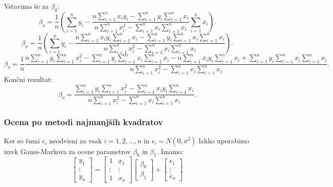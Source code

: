 \documentclass{article}
\begin{document}
Vstavimo še za $\beta_0$:
\begin{equation*}
\beta_o = \frac{1}{n} \left(\sum_{i=1}^n y_i - \frac{n\sum_{i=1}^nx_iy_i- \sum_{i=1}^n y_i \sum_{i=1}^n x_i}{n\sum_{i=1}^nx_i^2-\sum_{i=1}^nx_i\sum_{i=1}^nx_i}\sum_{i=1}^nx_i \right).
\end{equation*}
\begin{equation*}
\beta_o = \frac{1}{n} \left(\sum_{i=1}^n y_i - \frac{n\sum_{i=1}^nx_iy_i \sum_{i=1}^nx_i - \sum_{i=1}^n y_i \sum_{i=1}^n x_i\sum_{i=1}^nx_i }{n\sum_{i=1}^nx_i^2-\sum_{i=1}^nx_i\sum_{i=1}^nx_i}\right).
\end{equation*}
\begin{equation*}
\beta_o =  \frac{1}{n}\frac{n\sum_{i=1}^n y_i \sum_{i=1}^n x_i^2 - \sum_{i=1}^ny_i\sum_{i=1}^nx_i\sum_{i=1}^nx_i-n\sum_{i=1}^nx_iy_i \sum_{i=1}^nx_i + \sum_{i=1}^n y_i \sum_{i=1}^n x_i\sum_{i=1}^nx_i }{n\sum_{i=1}^nx_i^2-\sum_{i=1}^nx_i\sum_{i=1}^nx_i}.
\end{equation*}
Končni rezultat:
\begin{equation*}
\beta_o =  \frac{\sum_{i=1}^n y_i \sum_{i=1}^n x_i^2 -\sum_{i=1}^nx_iy_i \sum_{i=1}^nx_i}{n\sum_{i=1}^nx_i^2-\sum_{i=1}^nx_i\sum_{i=1}^nx_i}.
\end{equation*}


\subsubsection*{Ocena po metodi najmanjših kvadratov}
Ker so šumi $\epsilon_i$ neodvisni za vsak $i = 1,2,...,n$ in $\epsilon_i \sim N(0,\sigma^2)$ lahko uporabimo izrek Gauss-Markova za ocene parametrov $\beta_0$ in $\beta_1$.
Imamo:
\begin{equation*}
\begin{bmatrix}
y_1\\
\vdots\\
y_n
\end{bmatrix}
=
\begin{bmatrix}
1 & x_1\\
\vdots &\vdots \\
1 & x_n
\end{bmatrix}
\begin{bmatrix}
\beta_0\\
\beta_1
\end{bmatrix}
+
\begin{bmatrix}
\epsilon_1\\
\vdots\\
\epsilon_n
\end{bmatrix}
\end{equation*}
\end{document}
